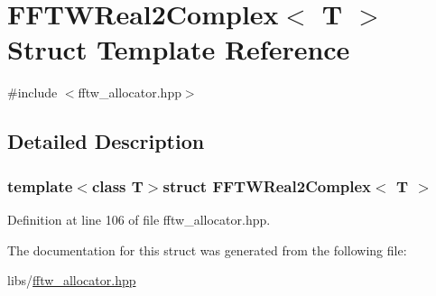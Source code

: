 \hypertarget{struct_f_f_t_w_real2_complex}{\section{F\-F\-T\-W\-Real2\-Complex$<$ T $>$ Struct Template Reference}
\label{struct_f_f_t_w_real2_complex}
}


{\ttfamily \#include $<$fftw\-\_\-allocator.\-hpp$>$}



\subsection{Detailed Description}
\subsubsection*{template$<$class T$>$struct F\-F\-T\-W\-Real2\-Complex$<$ T $>$}



Definition at line 106 of file fftw\-\_\-allocator.\-hpp.



The documentation for this struct was generated from the following file\-:\begin{DoxyCompactItemize}
\item 
libs/\hyperlink{fftw__allocator_8hpp}{fftw\-\_\-allocator.\-hpp}\end{DoxyCompactItemize}
